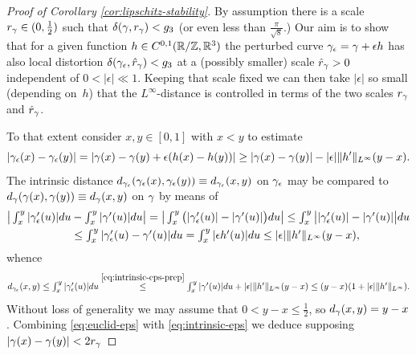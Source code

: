 \begin{proof}[Proof of Corollary {\ref{cor:lipschitz-stability}}]
By assumption there is a scale $r_\gamma\in(0,\tfrac12)$ such that $\delta(\gamma,r_\gamma)< g_3$ 
(or even
less than $\frac{\pi}{\sqrt{ 8 }}$.) Our aim is to show that for a given
function $h\in C^{0,1}(\mathbb{R}/\mathbb{Z},\mathbb{R}^3)$ the perturbed
curve $\gamma_\epsilon=\gamma+\epsilon h$ has also local distortion
$\delta(\gamma_\epsilon,\hat{r}_{\gamma})<g_3 $ at
a (possibly smaller) scale $\hat{r}_\gamma>0$ independent of $0<|\epsilon|\ll 1$. Keeping
that scale fixed we can then take $|\epsilon| $ so small 
(depending on~$h$) that the $L^\infty$-distance
is controlled in terms of the two scales $r_\gamma$ and $\hat{r}_\gamma$.

To that extent consider $x,y\in [0,1]$ with $x<y$ 
to estimate
\begin{equation}\label{eq:euclid-eps}
|\gamma_\epsilon(x)-\gamma_\epsilon(y)|=
|\gamma(x)-\gamma(y)+\epsilon(h(x)-h(y))|\ge |\gamma(x)-\gamma(y)|-|\epsilon|\|h'\|_{L^\infty}(y-x).
\end{equation}
The intrinsic distance $d_{\gamma_\epsilon}(\gamma_\epsilon(x),\gamma_\epsilon(y))\equiv
d_{\gamma_\epsilon}(x,y)$ on $\gamma_\epsilon$ may be compared
to $d_\gamma(\gamma(x),\gamma(y))\equiv d_\gamma(x,y)$ on $\gamma$ by means of
\begin{align}\label{eq:intrinsic-eps-prep}
\textstyle
\big|\int_x^y |\gamma_\epsilon'(u)|du & -
\textstyle
\int_x^y |\gamma'(u)|du\big|=
\big|\int_x^y \big(|\gamma_\epsilon'(u)|-|\gamma'(u)|\big)du\big|\le\int_x^y
\big| |\gamma_\epsilon'(u)|-|\gamma'(u)|\big|du\notag\\
&\textstyle
\le\int_x^y |\gamma_\epsilon'(u)-\gamma'(u)|du=
\int_x^y|\epsilon h'(u)|du\le |\epsilon|\|h'\|_{L^\infty}(y-x),
\end{align}
whence
\begin{equation}\label{eq:intrinsic-eps}
\textstyle
d_{\gamma_\epsilon}(x,y)\le\int_x^y|\gamma_\epsilon'(u)|du
\overset{\eqref{eq:intrinsic-eps-prep}}{\le}
\int_x^y|\gamma'(u)|du+|\epsilon|\|h'\|_{L^\infty}(y-x)
\le(y-x)(1+|\epsilon|\|h'\|_{L^\infty}).
\end{equation}
Without loss of generality we may assume that 
$0< y-x\le\tfrac12$, so
$d_\gamma(x,y) = y-x$.
Combining \eqref{eq:euclid-eps} with \eqref{eq:intrinsic-eps} we deduce supposing
 $|\gamma(x)-\gamma(y)|<2r_\gamma$

\end{proof}
